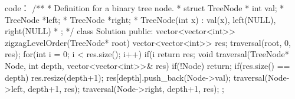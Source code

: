 code：
/**
 * Definition for a binary tree node.
 * struct TreeNode {
 *     int val;
 *     TreeNode *left;
 *     TreeNode *right;
 *     TreeNode(int x) : val(x), left(NULL), right(NULL) {}
 * };
 */
class Solution {
public:
    vector<vector<int>> zigzagLevelOrder(TreeNode* root) {
        vector<vector<int>> res;
        traversal(root, 0, res);
        for(int i = 0; i < res.size(); i++)
        {
            if(i %
        }
        return res;
    }
    void traversal(TreeNode* Node, int depth, vector<vector<int>>& res)
    {
        if(!Node) return;
        if(res.size() == depth)
            res.resize(depth+1);
        res[depth].push_back(Node->val);
        traversal(Node->left, depth+1, res);
        traversal(Node->right, depth+1, res);
    }
};
